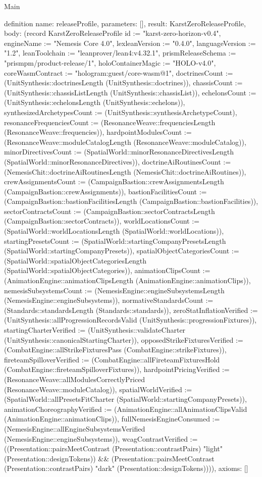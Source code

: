 \begin{lexlean}{Main}
\begin{semanticmodule}
definition{
  name: releaseProfile,
  parameters: [],
  result: KarstZeroReleaseProfile,
  body: (record KarstZeroReleaseProfile {id := "karst-zero-horizon-v0.4", engineName := "Nemesis Core 4.0", lexleanVersion := "0.4.0", languageVersion := "1.2", leanToolchain := "leanprover/lean4:v4.32.1", prismReleaseSchema := "prismpm/product-release/1", holoContainerMagic := "HOLO-v4.0", coreWasmContract := "hologram:guest/core-wasm@1", doctrinesCount := (UnitSynthesis::doctrinesLength (UnitSynthesis::doctrines)), chassisCount := (UnitSynthesis::chassisListLength (UnitSynthesis::chassisList)), echelonsCount := (UnitSynthesis::echelonsLength (UnitSynthesis::echelons)), synthesizedArchetypesCount := (UnitSynthesis::synthesisArchetypeCount), resonanceFrequenciesCount := (ResonanceWeave::frequenciesLength (ResonanceWeave::frequencies)), hardpointModulesCount := (ResonanceWeave::moduleCatalogLength (ResonanceWeave::moduleCatalog)), minorDirectivesCount := (SpatialWorld::minorResonanceDirectivesLength (SpatialWorld::minorResonanceDirectives)), doctrineAiRoutinesCount := (NemesisChit::doctrineAiRoutinesLength (NemesisChit::doctrineAiRoutines)), crewAssignmentsCount := (CampaignBastion::crewAssignmentsLength (CampaignBastion::crewAssignments)), bastionFacilitiesCount := (CampaignBastion::bastionFacilitiesLength (CampaignBastion::bastionFacilities)), sectorContractsCount := (CampaignBastion::sectorContractsLength (CampaignBastion::sectorContracts)), worldLocationsCount := (SpatialWorld::worldLocationsLength (SpatialWorld::worldLocations)), startingPresetsCount := (SpatialWorld::startingCompanyPresetsLength (SpatialWorld::startingCompanyPresets)), spatialObjectCategoriesCount := (SpatialWorld::spatialObjectCategoriesLength (SpatialWorld::spatialObjectCategories)), animationClipsCount := (AnimationEngine::animationClipsLength (AnimationEngine::animationClips)), nemesisSubsystemsCount := (NemesisEngine::engineSubsystemsLength (NemesisEngine::engineSubsystems)), normativeStandardsCount := (Standards::standardsLength (Standards::standards)), zeroStatInflationVerified := (UnitSynthesis::allProgressionRecordsValid (UnitSynthesis::progressionFixtures)), startingCharterVerified := (UnitSynthesis::validateCharter (UnitSynthesis::canonicalStartingCharter)), opposedStrikeFixturesVerified := (CombatEngine::allStrikeFixturesPass (CombatEngine::strikeFixtures)), fireteamSpilloverVerified := (CombatEngine::allFireteamFixturesHold (CombatEngine::fireteamSpilloverFixtures)), hardpointPricingVerified := (ResonanceWeave::allModulesCorrectlyPriced (ResonanceWeave::moduleCatalog)), spatialWorldVerified := (SpatialWorld::allPresetsFitCharter (SpatialWorld::startingCompanyPresets)), animationChoreographyVerified := (AnimationEngine::allAnimationClipsValid (AnimationEngine::animationClips)), fullNemesisEngineConsumed := (NemesisEngine::allEngineSubsystemsVerified (NemesisEngine::engineSubsystems)), wcagContrastVerified := ((Presentation::pairsMeetContrast (Presentation::contrastPairs) "light" (Presentation::designTokens)) && (Presentation::pairsMeetContrast (Presentation::contrastPairs) "dark" (Presentation::designTokens)))}),
  axioms: []
}


\end{semanticmodule}
\end{lexlean}
